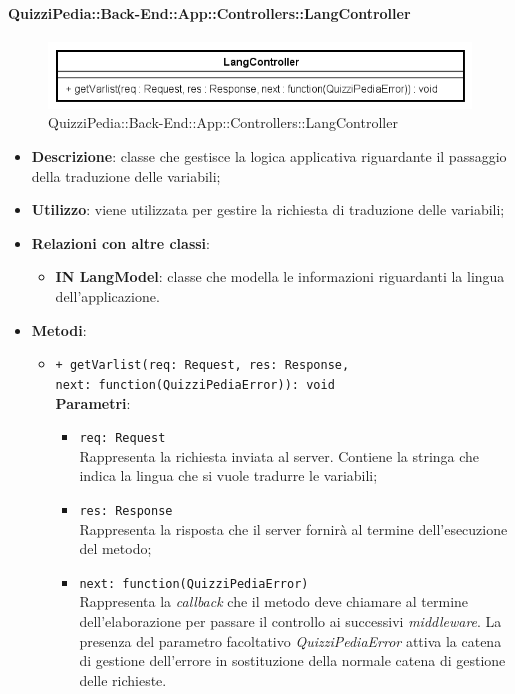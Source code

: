 \paragraph{QuizziPedia::Back-End::App::Controllers::LangController}
\label{QuizziPedia::Back-End::App::Controllers::UserController}
\begin{figure}[ht]
	\centering
	\includegraphics[scale=0.8]{UML/Classi/Back-End/QuizziPedia_Back-End_App_Controllers_langController.png}
	\caption{QuizziPedia::Back-End::App::Controllers::LangController}
\end{figure}
\FloatBarrier
\begin{itemize}
	\item 
	\textbf{Descrizione}:
	classe che gestisce la logica applicativa riguardante il passaggio della traduzione delle variabili;
	\item \textbf{Utilizzo}:
	viene utilizzata per gestire la richiesta di traduzione delle variabili;
	\item \textbf{Relazioni con altre classi}:
	\begin{itemize}
		\item \textbf{IN LangModel}: classe che modella le informazioni riguardanti la lingua dell'applicazione.
	\end{itemize}
	\item \textbf{Metodi}:
		\begin{itemize}
			\item \texttt{+ getVarlist(req: Request, res: Response,\\ next: function(QuizziPediaError)): void} \\
			\textbf{Parametri}:
				\begin{itemize}
					\item \texttt{req: Request} \\
					Rappresenta la richiesta inviata al server. Contiene la stringa che indica la lingua che si vuole tradurre le variabili;
					\item \texttt{res: Response} \\
					Rappresenta la risposta che il server fornirà al termine  dell'esecuzione del metodo;
					\item \texttt{next: function(QuizziPediaError)} \\
					Rappresenta la \textit{callback} che il metodo deve chiamare al termine dell'elaborazione per passare il controllo ai successivi \textit{middleware}. La presenza del parametro facoltativo \textit{QuizziPediaError} attiva la catena di gestione dell'errore in sostituzione della normale catena di gestione delle richieste.
				\end{itemize}
		\end{itemize}
\end{itemize}

